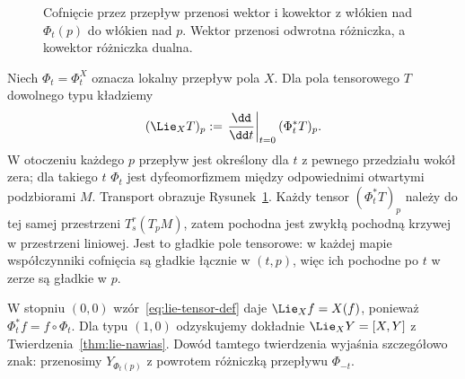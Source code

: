 \begin{figure}[H]
\centering
{}
\caption{Cofnięcie przez przepływ przenosi wektor i kowektor
z włókien nad $\Phi_t(p)$ do włókien nad $p$.
Wektor przenosi odwrotna różniczka, a kowektor różniczka dualna.}
\label{fig:lie-tensor-transport}
\end{figure}

\begin{definicja}
\label{def:lie-tensor}
Niech $\Phi_t=\Phi_t^X$ oznacza lokalny przepływ pola $X$.
Dla pola tensorowego $T$ dowolnego typu kładziemy
\begin{equation}\label{eq:lie-tensor-def}
 (\Lie_XT)_p
 :=\left.\frac{\dd}{\dd t}\right|_{t=0}
 (\Phi_t^*T)_p.
\end{equation}
W otoczeniu każdego $p$ przepływ jest określony dla $t$
z pewnego przedziału wokół zera; dla takiego $t$
$\Phi_t$ jest dyfeomorfizmem między odpowiednimi otwartymi
podzbiorami $M$. Transport obrazuje
Rysunek~\ref{fig:lie-tensor-transport}.
Każdy tensor $(\Phi_t^*T)_p$ należy do tej samej
przestrzeni $T^r_s(T_pM)$, zatem pochodna jest
zwykłą pochodną krzywej w przestrzeni liniowej. Jest to gładkie
pole tensorowe: w każdej mapie współczynniki cofnięcia są gładkie
łącznie w $(t,p)$, więc ich pochodne po $t$ w zerze są gładkie w $p$.
\end{definicja}

W stopniu $(0,0)$ wzór~\eqref{eq:lie-tensor-def} daje
$\Lie_Xf=X(f)$, ponieważ $\Phi_t^*f=f\circ\Phi_t$.
Dla typu $(1,0)$ odzyskujemy dokładnie
$\Lie_XY=[X,Y]$ z Twierdzenia~\ref{thm:lie-nawias}.
Dowód tamtego twierdzenia wyjaśnia szczegółowo znak:
przenosimy $Y_{\Phi_t(p)}$ z powrotem różniczką
przepływu $\Phi_{-t}$.

